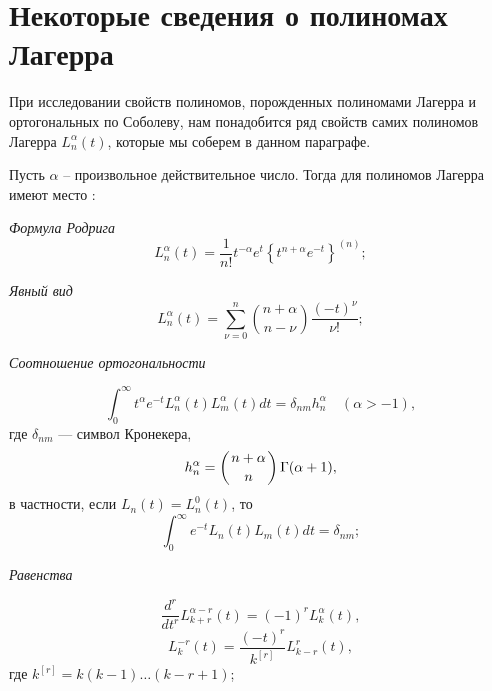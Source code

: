 \section{Некоторые сведения о полиномах Лагерра}
При исследовании свойств полиномов, порожденных полиномами Лагерра и ортогональных по Соболеву,   нам понадобится ряд свойств самих полиномов Лагерра $L_n^\alpha(t)$, которые мы соберем в данном параграфе.

Пусть $\alpha$ -- произвольное действительное число. Тогда для полиномов Лагерра  имеют место \cite{sob-lag-smj-Sege}:

\textit{Формула Родрига}
\begin{equation}\label{sob-lag-smj-2.1}
L_n^{\alpha}(t) = \frac{1}{n!}t^{-\alpha}e^{t} \left\{ t^{n+\alpha} e^{-t} \right\}^{(n)};
\end{equation}

\textit{Явный вид}
\begin{equation}\label{sob-lag-smj-2.2}
L_n^\alpha(t) =
\sum\limits_{\nu=0}^{n}
\binom{n+\alpha}{n-\nu}
\frac{(-t)^\nu}{\nu!};
\end{equation}

\textit{Соотношение ортогональности}

\begin{equation}
\label{sob-lag-smj-2.3}
\int_0^{\infty} t^{\alpha} e^{-t} L^{\alpha}_{n}(t) L^{\alpha}_{m}(t) dt = \delta_{nm} h^{\alpha}_n \quad (\alpha > -1),
\end{equation}
где $\delta_{nm}$ --- символ Кронекера,
\begin{equation*}\label{sob-lag-smj-2.4}
h^{\alpha}_n = \left( n+\alpha \atop n \right) \Gamma(\alpha +1),
\end{equation*}
в частности, если $L_{n}(t) = L^{0}_{n}(t)$, то
\begin{equation*}
\int_0^{\infty} e^{-t} L_{n}(t) L_{m}(t) dt = \delta_{nm};
\end{equation*}

\textit{ Равенства}

\begin{equation} \label{sob-lag-smj-2.6}
\frac{d^r}{dt^r} L_{k+r}^{\alpha-r}(t) = (-1)^{r} L_{k}^{\alpha}(t),
\end{equation}
\begin{equation}\label{sob-lag-smj-2.7}
L_{k}^{-r}(t) = \frac{(-t)^{r}}{k^{[r]}} L_{k-r}^{r}(t),
\end{equation}
где $k^{[r]} = k(k-1)\ldots(k-r+1)$;


